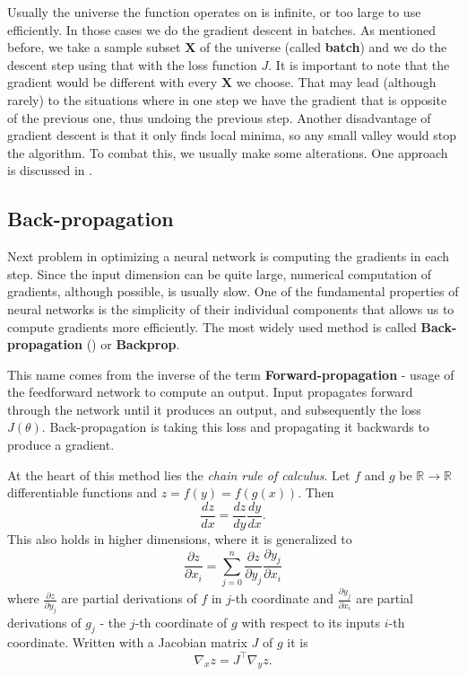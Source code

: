 Usually the universe the function operates on is infinite, or too large to use efficiently. In those cases we do the gradient descent in batches. As mentioned before, we take a sample subset $\textbf{X}$ of the universe (called \textbf{batch}) and we do the descent step using that with the loss function $J$. It is important to note that the gradient would be different with every $\textbf{X}$ we choose. That may lead (although rarely) to the situations where in one step we have the gradient that is opposite of the previous one, thus undoing the previous step. Another disadvantage of gradient descent is that it only finds local minima, so any small valley would stop the algorithm. To combat this, we usually make some alterations. One approach is discussed in .

\subsection{Back-propagation}

Next problem in optimizing a neural network is computing the gradients in each step. Since the input dimension can be quite large, numerical computation of gradients, although possible, is usually slow. One of the fundamental properties of neural networks is the simplicity of their individual components that allows us to compute gradients more efficiently. The most widely used method is called \textbf{Back-propagation} (\cite{backprop}) or \textbf{Backprop}.

This name comes from the inverse of the term \textbf{Forward-propagation} - usage of the feedforward network to compute an output. Input propagates forward through the network until it produces an output, and subsequently the loss $J(\theta)$. Back-propagation is taking this loss and propagating it backwards to produce a gradient.

At the heart of this method lies the \textit{chain rule of calculus}. Let $f$ and $g$ be $\mathbb{R}\rightarrow\mathbb{R}$ differentiable functions and $z=f(y)=f(g(x))$. Then $$\frac{dz}{d x}=\frac{d z}{d y}\frac{d y}{d x}.$$ This also holds in higher dimensions, where it is generalized to $$\frac{\partial z}{\partial x_i}=\sum_{j=0}^n\frac{\partial z}{\partial y_j}\frac{\partial y_j}{\partial x_i}$$ where $\frac{\partial z}{\partial y_j}$ are partial derivations of $f$ in $j$-th coordinate and $\frac{\partial y_j}{\partial x_i}$ are partial derivations of $g_j$ - the $j$-th coordinate of $g$ with respect to its inputs $i$-th coordinate. Written with a Jacobian matrix $J$ of $g$ it is $$\nabla_x z = J^\top \nabla_y z.$$

